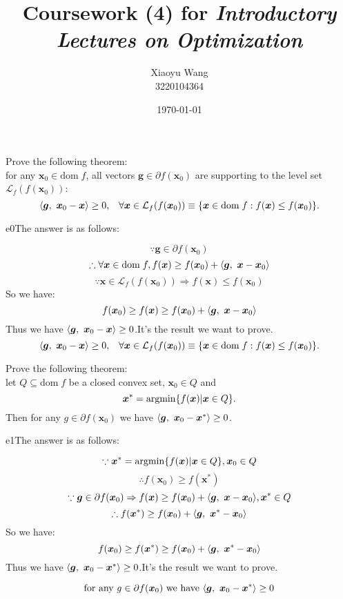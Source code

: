 \documentclass{article}
\title{Coursework (4) for \emph{Introductory Lectures on Optimization}}
\author{Xiaoyu Wang \\ 3220104364}
\date{\today}
\newcommand{\xB}{\bm{x}}
\newcommand{\gB}{\bm{g}}
\newcommand{\LM}{\mathcal{L}}
\newcommand{\domf}{\textrm{dom}\;f}
\newcommand{\argmin}{\mathop{\rm argmin}}
\begin{document}
\maketitle

\begin{excercise}\label{e0}
Prove the following theorem: \\
for any $\xB_0 \in \domf$, all vectors $\gB \in \partial f(\xB_0)$ are supporting to the level set $\LM_f (f(\xB_0))$:
\begin{equation}
	\innerproduct{\gB}{\xB_0 - \xB} \geq 0, \;\;\; \forall \xB \in \LM_f(f(\xB_0)) \equiv \{ \xB \in \domf: f(\xB) \leq f(\xB_0) \}.\nonumber
\end{equation}
\end{excercise}
\begin{PROOF}{e0}The answer is as follows:

	\[\because \gB \in \partial f(\xB_0)\]
	\[
		\therefore \forall \xB \in \domf, f(\xB)\ge f(\xB_0)+\innerproduct{\gB}{\xB-\xB_0}
	\]	
	\[
		\because \xB \in \LM_f(f(\xB_0)) \Rightarrow f(\xB) \leq f(\xB_0)
	\]
	So we have:
	\begin{equation}
		f(\xB_0) \geq f(\xB) \geq f(\xB_0) + \innerproduct{\gB}{\xB - \xB_0}
	\end{equation}
	Thus we have $\innerproduct{\gB}{\xB_0 - \xB} \geq 0$.It's the result we want to prove.
	\begin{equation}
		\innerproduct{\gB}{\xB_0 - \xB} \geq 0, \;\;\; \forall \xB \in \LM_f(f(\xB_0)) \equiv \{ \xB \in \domf: f(\xB) \leq f(\xB_0) \}.\nonumber
	\end{equation}
\end{PROOF}

\begin{excercise}\label{e1}
Prove the following theorem: \\
let $Q \subseteq \domf$ be a closed convex set,  $\xB_0 \in Q$ and 
 \begin{equation}
 	\xB^* = \argmin \{ f(\xB) | \xB \in Q \}.\nonumber
 \end{equation}
 Then for any $g \in \partial f(\xB_0)$ we have $\innerproduct{\gB}{\xB_0 - \xB^*} \geq 0$.
\end{excercise}
\begin{PROOF}{e1}The answer is as follows:

	\[\because \xB^* = \argmin \{ f(\xB) | \xB \in Q \}, \xB_0 \in Q\]
	\[
		\therefore   f(\xB_0) \geq f(\xB^*)
	\]	
	\[
		\because \gB \in \partial f(\xB_0) \Rightarrow f(\xB)\ge f(\xB_0)+\innerproduct{\gB}{\xB-\xB_0},\xB^* \in Q
	\]
	\[
		\therefore f(\xB^*)\ge f(\xB_0)+\innerproduct{\gB}{\xB^*-\xB_0}
	\]
	So we have:
	\begin{equation}
		f(\xB_0) \geq f(\xB^*) \geq f(\xB_0) + \innerproduct{\gB}{\xB^* - \xB_0}
	\end{equation}
	Thus we have $\innerproduct{\gB}{\xB_0 - \xB^*} \geq 0$.It's the result we want to prove.

	\[
	\text{for any } g \in \partial f(\xB_0) \text{ we have } \innerproduct{\gB}{\xB_0 - \xB^*} \geq 0
	\]


\end{PROOF}
\end{document}

